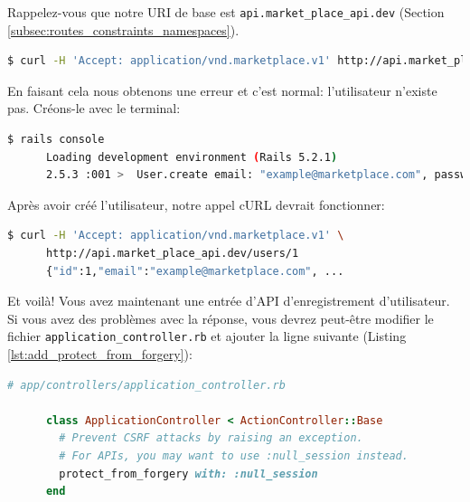 \documentclass[]{report}
\begin{document}
      Rappelez-vous que notre URI de base est \verb|api.market_place_api.dev| (Section \ref{subsec:routes_constraints_namespaces}).

      \begin{scriptsize}
      \begin{lstlisting}[language=bash]
      $ curl -H 'Accept: application/vnd.marketplace.v1' http://api.market_place_api.dev/users/1
      \end{lstlisting}
      \end{scriptsize}

      En faisant cela nous obtenons une erreur et c'est normal: l'utilisateur n'existe pas. Créons-le avec le terminal:

      \begin{scriptsize}
      \begin{lstlisting}[language=bash]
      $ rails console
      Loading development environment (Rails 5.2.1)
      2.5.3 :001 >  User.create email: "example@marketplace.com", password: "12345678", password_confirmation: "12345678"
      \end{lstlisting}
      \end{scriptsize}

      Après avoir créé l'utilisateur, notre appel cURL devrait fonctionner:

      \begin{scriptsize}
      \begin{lstlisting}[language=bash]
      $ curl -H 'Accept: application/vnd.marketplace.v1' \
      http://api.market_place_api.dev/users/1
      {"id":1,"email":"example@marketplace.com", ...
      \end{lstlisting}
      \end{scriptsize}

      Et voilà! Vous avez maintenant une entrée d'API d'enregistrement d'utilisateur. Si vous avez des problèmes avec la réponse, vous devrez peut-être modifier le fichier \verb|application_controller.rb| et ajouter la ligne suivante (Listing \ref{lst:add_protect_from_forgery}):

      \begin{scriptsize}
      \begin{lstlisting}[language=ruby, caption={Correction de la réponde de l'API}, label={lst:add_protect_from_forgery}]
      # app/controllers/application_controller.rb

      class ApplicationController < ActionController::Base
        # Prevent CSRF attacks by raising an exception.
        # For APIs, you may want to use :null_session instead.
        protect_from_forgery with: :null_session
      end
      \end{lstlisting}
      \end{scriptsize}
\end{document}

